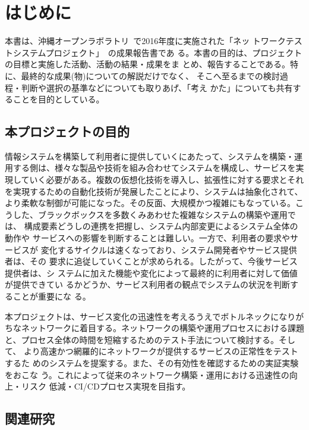 
\chapter{はじめに}
\label{chap:abstract}

本書は、沖縄オープンラボラトリ~\cite{ool-web}で2016年度に実施された「ネッ
トワークテストシステムプロジェクト」~\cite{ool-l1pj-web}の成果報告書であ
る。本書の目的は、プロジェクトの目標と実施した活動、活動の結果・成果をま
とめ、報告することである。特に、最終的な成果(物)についての解説だけでなく、
そこへ至るまでの検討過程・判断や選択の基準などについても取りあげ、「考え
かた」についても共有することを目的としている。

 \section{本プロジェクトの目的}
 \label{sec:pj-purpose}


情報システムを構築して利用者に提供していくにあたって、システムを構築・運
用する側は、様々な製品や技術を組み合わせてシステムを構成し、サービスを実
現していく必要がある。複数の仮想化技術を導入し、拡張性に対する要求とそれ
を実現するための自動化技術が発展したことにより、システムは抽象化されて、
より柔軟な制御が可能になった。その反面、大規模かつ複雑にもなっている。こ
うした、ブラックボックスを多数くみあわせた複雑なシステムの構築や運用では、
構成要素どうしの連携を把握し、システム内部変更によるシステム全体の動作や
サービスへの影響を判断することは難しい。一方で、利用者の要求やサービスが
変化するサイクルは速くなっており、システム開発者やサービス提供者は、その
要求に追従していくことが求められる。したがって、今後サービス提供者は、シ
ステムに加えた機能や変化によって最終的に利用者に対して価値が提供できてい
るかどうか、サービス利用者の観点でシステムの状況を判断することが重要にな
る。

本プロジェクトは、サービス変化の迅速性を考えるうえでボトルネックになりが
ちなネットワークに着目する。ネットワークの構築や運用プロセスにおける課題
と、プロセス全体の時間を短縮するためのテスト手法について検討する。そして、
より高速かつ網羅的にネットワークが提供するサービスの正常性をテストするた
めのシステムを提案する。また、その有効性を確認するための実証実験をおこな
う。これによって従来のネットワーク構築・運用における迅速性の向上・リスク
低減・CI/CDプロセス実現を目指す。

 \section{関連研究}
 \label{sec:related-research}

